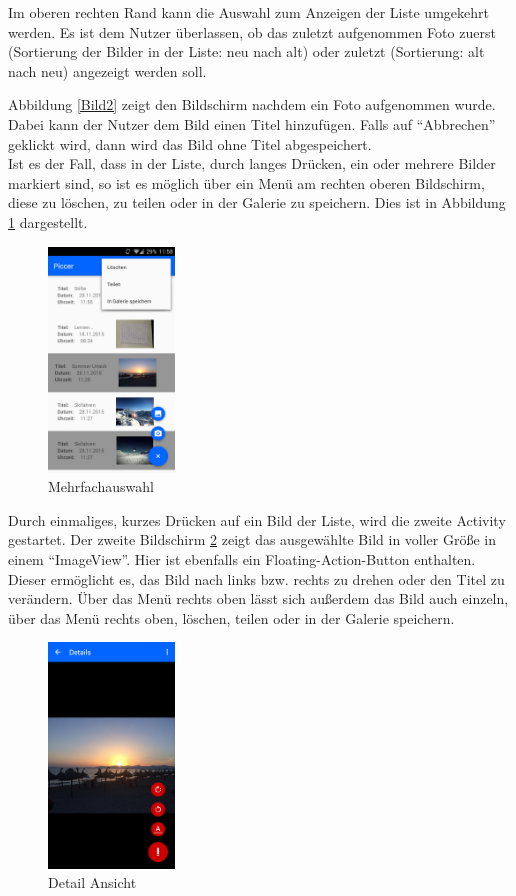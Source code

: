 Im oberen rechten Rand kann die Auswahl zum Anzeigen der Liste umgekehrt werden. Es ist dem Nutzer überlassen, ob das zuletzt aufgenommen Foto zuerst (Sortierung der Bilder in der Liste: neu nach alt) oder zuletzt (Sortierung: alt nach neu) angezeigt werden soll.



Abbildung \ref{Bild2} zeigt den Bildschirm nachdem ein Foto aufgenommen wurde.
Dabei kann der Nutzer dem Bild einen Titel hinzufügen. Falls auf \enquote{Abbrechen}
 geklickt wird, dann wird das Bild ohne Titel abgespeichert.\\

Ist es der Fall, dass in der Liste, durch langes Drücken, ein oder mehrere Bilder markiert sind, so ist es möglich über ein Menü am rechten oberen Bildschirm, diese zu löschen, zu teilen oder in der Galerie zu speichern. Dies ist in Abbildung \ref{Bild3} dargestellt.
\begin{figure}[H]
\centering
\includegraphics[width=0.3\textwidth]{images/bild_3}
\caption{Mehrfachauswahl}
\label{Bild3}
\end{figure}

Durch einmaliges, kurzes Drücken auf ein Bild der Liste, wird die zweite Activity
gestartet. Der zweite Bildschirm \ref{Bild4} zeigt das ausgewählte Bild in voller Größe in einem \enquote{ImageView}. Hier ist ebenfalls ein Floating-Action-Button enthalten. Dieser ermöglicht es, das Bild nach links bzw. rechts zu drehen oder den Titel zu verändern.
Über das Menü rechts oben lässt sich außerdem das Bild auch einzeln, über das Menü rechts oben, löschen, teilen oder in der Galerie speichern.

\begin{figure}[H]
\begin{center}
\includegraphics[width=0.3\textwidth]{images/bild_4}
\end{center}

\caption{Detail Ansicht}
\label{Bild4}
\end{figure}

